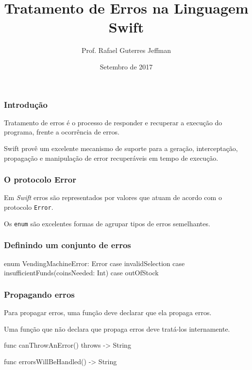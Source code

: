 



\title{Tratamento de Erros na Linguagem Swift}
\author{Prof. Rafael Guterres Jeffman}
\date{Setembro de 2017}



\coverframe

\begin{frame}
    \frametitle{Introdução}

    Tratamento de erros é o processo de responder e recuperar a execução
    do programa, frente a ocorrência de erros.

    \vspace{.7cm}

    Swift provê um excelente mecanismo de suporte para a geração,
    interceptação, propagação e manipulação de error recuperáveis em
    tempo de execução.
\end{frame}

\begin{frame}
    \frametitle{O protocolo Error}

    Em \textit{Swift} erros são representados por valores que atuam de
    acordo com o protocolo \texttt{Error}.

    \vspace{.7cm}

    Os {\color{green}\texttt{enum}} são excelentes formas de agrupar
    tipos de erros semelhantes.
\end{frame}

\begin{frame}[fragile]
    \frametitle{Definindo um conjunto de erros}

    \begin{swift}
    enum VendingMachineError: Error {
        case invalidSelection
        case insufficientFunds(coinsNeeded: Int)
        case outOfStock
    }
    \end{swift}

\end{frame}

\begin{frame}[fragile]
    \frametitle{Propagando erros}
    
    Para propagar erros, uma função deve declarar que ela propaga erros.
    
    \vspace{.5cm}
    Uma função que não declara que propaga erros deve tratá-los
    internamente.

    \begin{swift}
  func canThrowAnError() throws -> String

  func errorsWillBeHandled() -> String
    \end{swift}

\end{frame}

